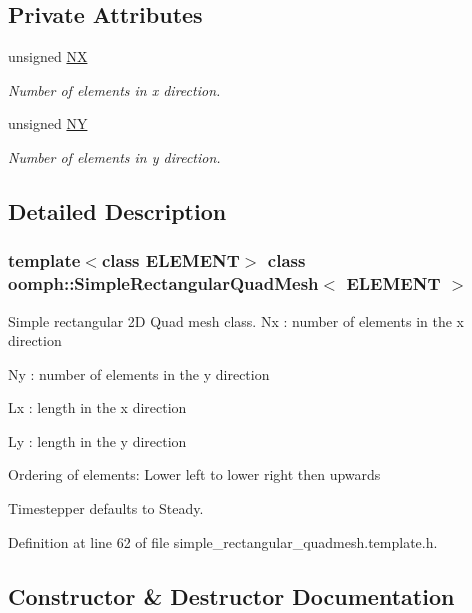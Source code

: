 \subsection*{Private Attributes}
\begin{DoxyCompactItemize}
\item 
unsigned \hyperlink{classoomph_1_1SimpleRectangularQuadMesh_ab6ec406039698222f051d4ec977f1788}{NX}
\begin{DoxyCompactList}\small\item\em Number of elements in x direction. \end{DoxyCompactList}\item 
unsigned \hyperlink{classoomph_1_1SimpleRectangularQuadMesh_a6db96125790b46858fb00eef46bf7201}{NY}
\begin{DoxyCompactList}\small\item\em Number of elements in y direction. \end{DoxyCompactList}\end{DoxyCompactItemize}


\subsection{Detailed Description}
\subsubsection*{template$<$class E\+L\+E\+M\+E\+NT$>$\newline
class oomph\+::\+Simple\+Rectangular\+Quad\+Mesh$<$ E\+L\+E\+M\+E\+N\+T $>$}

Simple rectangular 2D Quad mesh class. Nx \+: number of elements in the x direction

Ny \+: number of elements in the y direction

Lx \+: length in the x direction

Ly \+: length in the y direction

Ordering of elements\+: \textquotesingle{}Lower left\textquotesingle{} to \textquotesingle{}lower right\textquotesingle{} then \textquotesingle{}upwards\textquotesingle{}

Timestepper defaults to Steady. 

Definition at line 62 of file simple\+\_\+rectangular\+\_\+quadmesh.\+template.\+h.



\subsection{Constructor \& Destructor Documentation}
\mbox{\label{classoomph_1_1SimpleRectangularQuadMesh_a8224b55f7d99a36debacb3f4cc293407}} 

